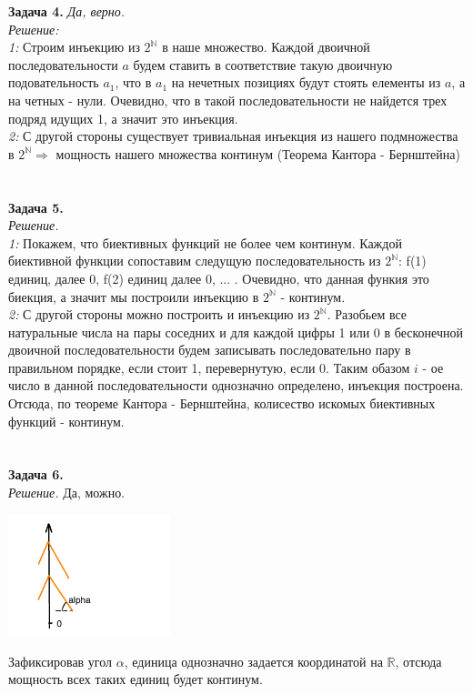 \documentclass[12pt,a4paper]{scrartcl}
\begin{document}
\noindent \textbf{Задача 4.} 
\textit{Да, верно.}  \\
\textit{Решение:} \\
\textit{1:} Строим инъекцию из $2^{\mathbb{N}}$ в наше множество. Каждой двоичной последовательности $a$ будем ставить в соответствие  такую двоичную подовательность $a_1$, что в $a_1$  на нечетных позициях будут  стоять елементы из $a$, а на четных - нули. Очевидно, что в такой последовательности не найдется трех подряд идущих 1, а значит это инъекция. \\ 
\textit{2:}  С другой стороны существует тривиальная инъекция из нашего подмножества в $2^{\mathbb{N}} \Rightarrow$ мощность нашего множества континум (Теорема Кантора - Бернштейна)  
\\ \\ \\


\noindent \textbf{Задача 5.} \\
\textit{Решение.} \\
\textit {1:} Покажем, что биективных функций не более чем континум. Каждой биективной функции  сопоставим следущую последовательность из $2^\mathbb{N}$: f(1) единиц, далее 0, f(2) единиц далее 0, ... . Очевидно, что данная функия это биекция, а значит мы построили инъекцию в $2^\mathbb{N}$ - континум. \\
\textit{2:} С другой стороны можно построить и инъекцию из  $2^\mathbb{N}$. Разобьем все натуральные числа на пары соседних и для каждой цифры 1 или 0 в бесконечной двоичной последовательности будем записывать последовательно пару  в правильном порядке, если стоит 1, перевернутую, если 0. Таким обазом $i$ - ое число в данной последовательности однозначно определено, инъекция построена.\\
Отсюда, по теореме Кантора - Бернштейна, колисество искомых биективных функций - континум. 
\\ \\ \\


\noindent \textbf{Задача 6.} \\
\textit{Решение.} Да, можно. \\
\begin{center}
	\includegraphics[height = 100pt]{6.png}	
\end{center}
Зафиксировав угол $\alpha$, единица однозначно задается координатой на $\mathbb{R}$, отсюда мощность всех таких единиц будет континум. 
\\ \\ \\
\end{document}

